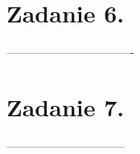 \documentclass[polish,a4paper]{article}
\begin{document}
\section{Zadanie 6.}
----------------------------------
%
%
%

\section{Zadanie 7.}
--------------------------------
%
\end{document}
